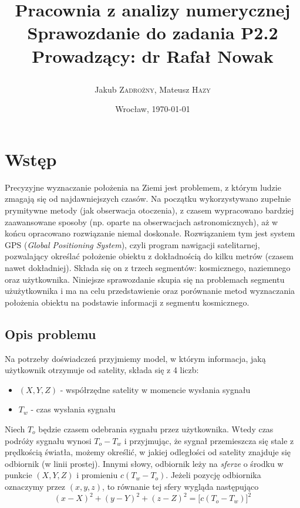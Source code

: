 \documentclass{article}
\title{\LARGE\textbf{Pracownia z analizy numerycznej} \\ Sprawozdanie do zadania \textbf{P2.2} \\
\vskip 0.2cm \large Prowadzący: dr Rafał Nowak\\
\author{ Jakub \textsc{Zadrożny}, Mateusz \textsc{Hazy}}}
\date{Wrocław, \today}
\begin{document}
\maketitle

\section{Wstęp}
Precyzyjne wyznaczanie położenia na Ziemi jest problemem, z którym ludzie zmagają się od najdawniejszych czasów.
Na początku wykorzystywano zupełnie prymitywne metody (jak obserwacja otoczenia), z czasem wypracowano bardziej
zaawansowane sposoby (np. oparte na obserwacjach astronomicznych), aż w końcu opracowano rozwiązanie niemal doskonałe.
Rozwiązaniem tym jest system GPS (\textit{Global Positioning System}), czyli program nawigacji satelitarnej,
pozwalający określać położenie obiektu z dokładnością do kilku metrów (czasem nawet dokładniej).
Składa się on z trzech segmentów: kosmicznego, naziemnego oraz użytkownika. Niniejsze sprawozdanie skupia się na problemach
segmentu użużytkownika i ma na celu przedstawienie oraz porównanie metod wyznaczania położenia obiektu na podstawie
informacji z segmentu kosmicznego.

\subsection{Opis problemu}
Na potrzeby doświadczeń przyjmiemy model, w którym informacja, jaką użytkownik otrzymuje od satelity,
składa się z 4 liczb:
\begin{itemize}
    \item $(X, Y, Z)$ - współrzędne satelity w momencie wysłania sygnału
	\item $T_w$ - czas wysłania sygnału
\end{itemize}
Niech $T_{o}$ będzie czasem odebrania sygnału przez użytkownika. Wtedy czas podróży sygnału wynosi $T_o - T_w$ i
przyjmując, że sygnał przemieszcza się stale z prędkością światła, możemy określić, w jakiej odległości od satelity
znajduje się odbiornik (w linii prostej). Innymi słowy, odbiornik leży na \textit{sferze} o środku w punkcie $(X, Y, Z)$
i promieniu $c(T_w-T_o)$. Jeżeli pozycję odbiornika oznaczymy przez $(x, y, z)$, to równanie tej sfery wygląda następująco
\[
(x - X)^2 + (y - Y)^2 + (z - Z)^2 = \big[c(T_{o} - T_{w})\big]^2
\]
\end{document}
